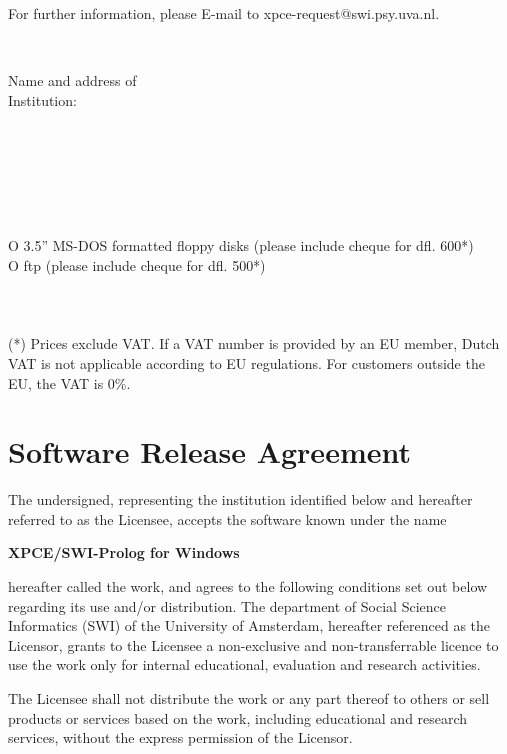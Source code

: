 For further information, please E-mail to xpce-request@swi.psy.uva.nl.

\newlength{\tag}
\settowidth{\tag}{Authorised Signature: }
\newlength{\rest}
\setlength{\rest}{\textwidth}
\addtolength{\rest}{-\tag}

\newcommand{\fillin}{\dotfill\mbox{}}
\newcommand{\onlydots}{\mbox{}\fillin}
\newcommand{\next}{\\[2mm]}

\vspace{0.5cm}
\fillin \next
\parbox[t]{\tag}{Name and address of \\ Institution:}%
\parbox[t]{\rest}{\onlydots \next \onlydots \next \onlydots} \next
{}\fillin \next
{}\fillin \next
{}O 3.5'' MS-DOS formatted floppy disks (please include cheque for dfl. 600*) \\
\makebox[\tag][l]{\mbox{}}O ftp (please include cheque for dfl. 500*) \next
{}\fillin \next
{}\fillin \next
{}\fillin \\
{\footnotesize(*) Prices exclude VAT.  If a VAT number is provided by
an EU member, Dutch VAT is not applicable according to EU regulations.
For customers outside the EU, the VAT is 0\%.}

\section*{Software Release Agreement}

The undersigned, representing the institution identified below and
hereafter referred to as the Licensee, accepts the software known under
the name

\vspace{2mm}
\centerline{\bf XPCE/SWI-Prolog for Windows}
\vspace{2mm}

hereafter called the work, and agrees to the following conditions set
out below regarding its use and/or distribution.  The department of
Social Science Informatics (SWI) of the University of Amsterdam,
hereafter referenced as the Licensor, grants to the Licensee a
non-exclusive and non-transferrable licence to use the work only for
internal educational, evaluation and research activities.

The Licensee shall not distribute the work or any part thereof to others
or sell products or services based on the work, including educational
and research services, without the express permission of the Licensor.

